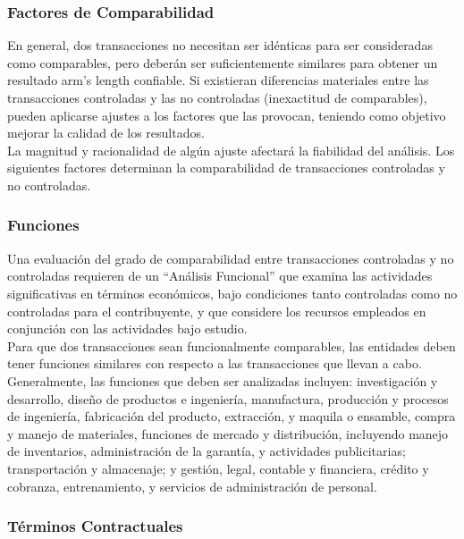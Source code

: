 \begin{enumerate}[1.]
\subsubsection*{Factores de Comparabilidad}

En general, dos transacciones no necesitan ser idénticas para ser consideradas como comparables, pero deberán ser suficientemente similares para obtener un resultado arm’s length confiable. Si existieran diferencias materiales entre las transacciones controladas y las no controladas (inexactitud de comparables), pueden aplicarse ajustes a los factores que las provocan, teniendo como objetivo mejorar la calidad de los resultados.\\

La magnitud y racionalidad de algún ajuste afectará la fiabilidad del análisis. Los siguientes factores determinan la comparabilidad de transacciones controladas y no controladas.\\

\subsubsection*{Funciones}

Una evaluación del grado de comparabilidad entre transacciones controladas y no controladas requieren de un ``Análisis Funcional'' que examina las actividades significativas en términos económicos, bajo condiciones tanto controladas como no controladas para el contribuyente, y que considere los recursos empleados en conjunción con las actividades bajo estudio.\\ 

Para que dos transacciones sean funcionalmente comparables, las entidades deben tener funciones similares con respecto a las transacciones que llevan a cabo. \\

Generalmente, las funciones que deben ser analizadas incluyen: investigación y desarrollo, diseño de productos e ingeniería, manufactura, producción y procesos de ingeniería, fabricación del producto, extracción, y maquila o ensamble, compra y manejo de materiales, funciones de mercado y distribución, incluyendo manejo de inventarios, administración de la garantía, y actividades publicitarias; transportación y almacenaje; y gestión, legal, contable y financiera, crédito y cobranza, entrenamiento, y servicios de administración de personal.\\


\subsubsection*{Términos Contractuales}


\end{enumerate}

